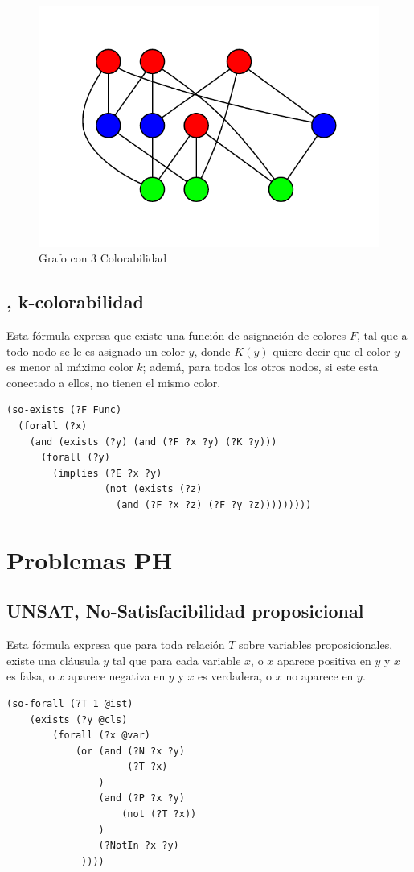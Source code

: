 \begin{figure}[h!]
\centering
\includegraphics[width=\textwidth]{figuras/coloring.pdf}
\caption[Grafo con \textit{3 Colorabilidad}]{Grafo con 3 Colorabilidad}
\label{col3}  
\end{figure}

\subsection{\KCOL, k-colorabilidad}
Esta fórmula expresa que existe una función de asignación de colores $F$, tal que a todo nodo se le es
asignado un color $y$, donde $K(y)$ quiere decir que el color $y$ es menor al máximo color
$k$; ademá, para todos los otros nodos, si este esta conectado a ellos, no
tienen el mismo color.

\begin{verbatim}
(so-exists (?F Func)
  (forall (?x) 
    (and (exists (?y) (and (?F ?x ?y) (?K ?y)))
      (forall (?y) 
        (implies (?E ?x ?y)
                 (not (exists (?z)
                   (and (?F ?x ?z) (?F ?y ?z)))))))))
\end{verbatim}

\section{Problemas PH}

\subsection{UNSAT, No-Satisfacibilidad proposicional}
Esta fórmula expresa que para toda relación $T$ sobre variables
proposicionales, existe una cláusula $y$ tal que para cada variable $x$, o $x$
aparece positiva en $y$ y $x$ es falsa, o $x$ aparece negativa en $y$ y $x$ es
verdadera, o $x$ no aparece en $y$.
\begin{verbatim}
(so-forall (?T 1 @ist)
    (exists (?y @cls)
        (forall (?x @var)
            (or (and (?N ?x ?y)
                     (?T ?x)
                )
                (and (?P ?x ?y)
                    (not (?T ?x))
                )
                (?NotIn ?x ?y)
             ))))
\end{verbatim}

